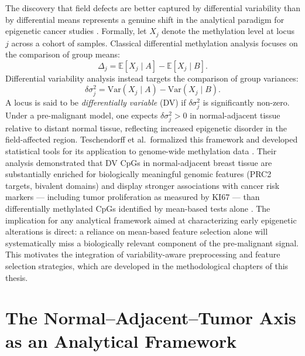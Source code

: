 The discovery that field defects are better captured by differential variability
than by differential means represents a genuine shift in the analytical paradigm
for epigenetic cancer studies \cite{Teschendorff2014}.
Formally, let $X_j$ denote the methylation level at locus $j$ across a cohort
of samples. Classical differential methylation analysis focuses on the comparison
of group means:
\begin{equation}
\Delta_j = \mathbb{E}[X_j \mid A] - \mathbb{E}[X_j \mid B].
\end{equation}
Differential variability analysis instead targets the comparison of group
variances:
\begin{equation}
\delta\sigma^2_j = \text{Var}(X_j \mid A) - \text{Var}(X_j \mid B).
\end{equation}
A locus is said to be \textit{differentially variable} (DV) if $\delta\sigma^2_j$
is significantly non-zero. Under a pre-malignant model, one expects $\delta\sigma^2_j > 0$
in normal-adjacent tissue relative to distant normal tissue, reflecting increased
epigenetic disorder in the field-affected region.
Teschendorff et al.\ formalized this framework and developed statistical tools
for its application to genome-wide methylation data \cite{Teschendorff2014}.
Their analysis demonstrated that DV CpGs in normal-adjacent breast tissue are
substantially enriched for biologically meaningful genomic features (PRC2 targets,
bivalent domains) and display stronger associations with cancer risk markers —
including tumor proliferation as measured by KI67 — than differentially methylated
CpGs identified by mean-based tests alone \cite{Teschendorff2016}.
The implication for any analytical framework aimed at characterizing early
epigenetic alterations is direct: a reliance on mean-based feature selection alone
will systematically miss a biologically relevant component of the pre-malignant
signal. This motivates the integration of variability-aware preprocessing and
feature selection strategies, which are developed in the methodological chapters
of this thesis.

\section{The Normal--Adjacent--Tumor Axis as an Analytical Framework}
\label{sec:bio_synthesis}

